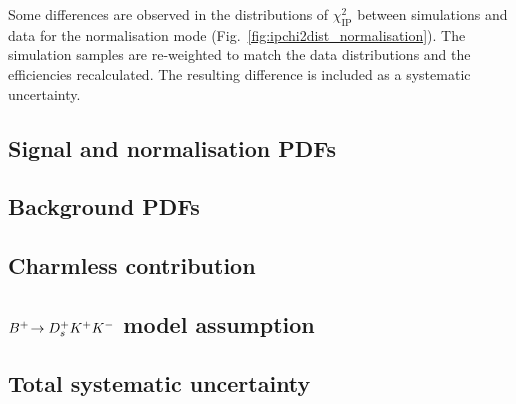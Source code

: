 \begin{description}
Some differences are observed in the distributions of $\chi^{2}_{\text{IP}}$ between simulations and data for the normalisation mode (Fig.~\ref{fig:ipchi2dist_normalisation}). The simulation samples are re-weighted to match the data distributions and the efficiencies recalculated. The resulting difference is included as a systematic uncertainty.
\end{description}

\subsection{Signal and normalisation PDFs}

\subsection{Background PDFs}

\subsection{Charmless contribution}

\subsection{${{{B}^+}}\!\rightarrow {\ensuremath{{D}^+_{s}}}{\ensuremath{{K}^+}}{\ensuremath{{K}^-}}$ model assumption}

\subsection{Total systematic uncertainty}


